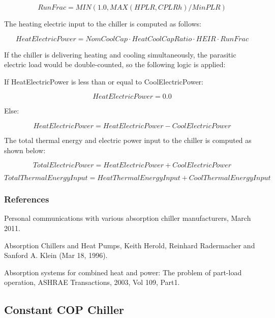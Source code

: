 \begin{equation}
RunFrac = MIN(1.0,MAX\left( {HPLR,CPLRh} \right)/MinPLR)
\end{equation}

The heating electric input to the chiller is computed as follows:

\begin{equation}
HeatElectricPower = NomCoolCap \cdot HeatCoolCapRatio \cdot HEIR \cdot RunFrac
\end{equation}

If the chiller is delivering heating and cooling simultaneously, the parasitic electric load would be double-counted, so the following logic is applied:

If HeatElectricPower is less than or equal to CoolElectricPower:

\begin{equation}
  HeatElectricPower = 0.0
\end{equation}

Else:

\begin{equation}
  HeatElectricPower = HeatElectricPower - CoolElectricPower
\end{equation}

The total thermal energy and electric power input to the chiller is computed as shown below:

\begin{equation}
TotalElectricPower = HeatElectricPower + CoolElectricPower
\end{equation}

\begin{equation}
TotalThermalEnergyInput = HeatThermalEnergyInput + CoolThermalEnergyInput
\end{equation}

\subsubsection{References}\label{references-009}

Personal communications with various absorption chiller manufacturers, March 2011.

Absorption Chillers and Heat Pumps, Keith Herold, Reinhard Radermacher and Sanford A. Klein (Mar 18, 1996).

Absorption systems for combined heat and power: The problem of part-load operation, ASHRAE Transactions, 2003, Vol 109, Part1.

\subsection{Constant COP Chiller}\label{constant-cop-chiller}

